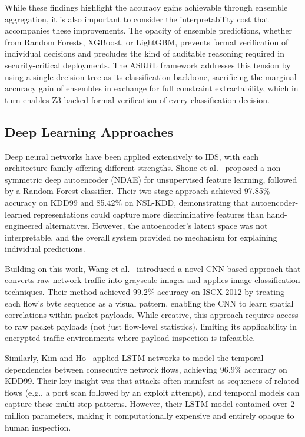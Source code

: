 \documentclass[12pt, letterpaper, oneside]{report}
\newcommand{\ASRRL}{\textsc{ASRRL}}
\begin{document}
While these findings highlight the accuracy gains achievable through ensemble aggregation, it is also important to consider the interpretability cost that accompanies these improvements. The opacity of ensemble predictions, whether from Random Forests, XGBoost, or LightGBM, prevents formal verification of individual decisions and precludes the kind of auditable reasoning required in security-critical deployments. The \ASRRL{} framework addresses this tension by using a single decision tree as its classification backbone, sacrificing the marginal accuracy gain of ensembles in exchange for full constraint extractability, which in turn enables Z3-backed formal verification of every classification decision.

\subsection{Deep Learning Approaches}

Deep neural networks have been applied extensively to IDS, with each architecture family offering different strengths. Shone et al.~\cite{shone2018} proposed a non-symmetric deep autoencoder (NDAE) for unsupervised feature learning, followed by a Random Forest classifier. Their two-stage approach achieved 97.85\% accuracy on KDD99 and 85.42\% on NSL-KDD, demonstrating that autoencoder-learned representations could capture more discriminative features than hand-engineered alternatives. However, the autoencoder's latent space was not interpretable, and the overall system provided no mechanism for explaining individual predictions.

Building on this work, Wang et al.~\cite{wang2017} introduced a novel CNN-based approach that converts raw network traffic into grayscale images and applies image classification techniques. Their method achieved 99.2\% accuracy on ISCX-2012 by treating each flow's byte sequence as a visual pattern, enabling the CNN to learn spatial correlations within packet payloads. While creative, this approach requires access to raw packet payloads (not just flow-level statistics), limiting its applicability in encrypted-traffic environments where payload inspection is infeasible.

Similarly, Kim and Ho~\cite{kim2016} applied LSTM networks to model the temporal dependencies between consecutive network flows, achieving 96.9\% accuracy on KDD99. Their key insight was that attacks often manifest as sequences of related flows (e.g., a port scan followed by an exploit attempt), and temporal models can capture these multi-step patterns. However, their LSTM model contained over 2 million parameters, making it computationally expensive and entirely opaque to human inspection.
\end{document}
